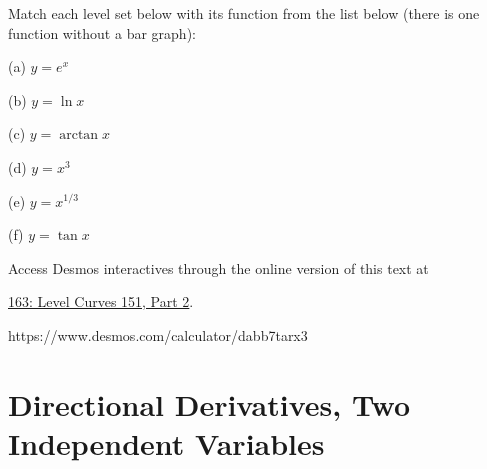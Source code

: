 \documentclass{ximera}
\begin{document}
\begin{exploration} \label{Edsft45t5}
Match each level set below with its function from the list below (there is one function without a bar graph):

(a) $y=e^x$

(b) $y=\ln x$

(c) $y=\arctan x$

(d) $y=x^3$

(e) $y=x^{1/3}$

(f) $y=\tan x$

 
\begin{onlineOnly}
    \begin{center}
\end{center}
\end{onlineOnly}

Access Desmos interactives through the online version of this text at
 
\href{https://www.desmos.com/calculator/dabb7tarx3}{163: Level Curves 151, Part 2}.

https://www.desmos.com/calculator/dabb7tarx3
\end{exploration}



\section{Directional Derivatives, Two Independent Variables}
\end{document}

